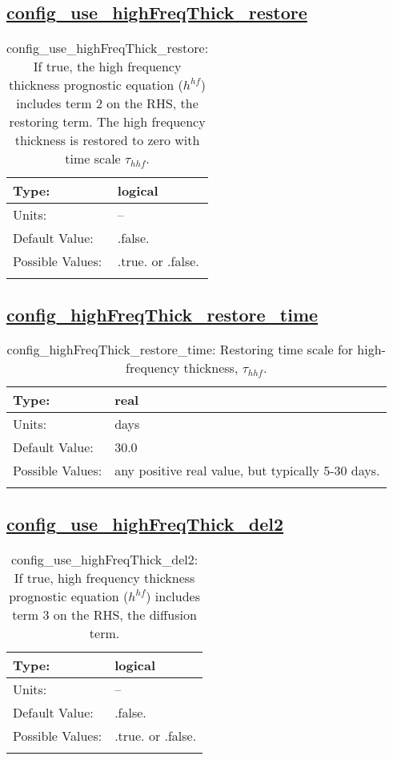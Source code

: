 \subsection[config\_use\_highFreqThick\_restore]{\hyperref[sec:nm_tab_ALE_frequency_filtered_thickness]{config\_use\_highFreqThick\_restore}}
\label{subsec:nm_sec_config_use_highFreqThick_restore}
\begin{center}
\begin{longtable}{| p{2.0in} || p{4.0in} |}
    \hline
    Type: & logical \\
    \hline
    Units: & -- \\
    \hline
    Default Value: & .false. \\
    \hline
    Possible Values: & .true. or .false. \\
    \hline
    \caption{config\_use\_highFreqThick\_restore: If true, the high frequency thickness prognostic equation ($h^{hf}$) includes term 2 on the RHS, the restoring term.  The high frequency thickness is restored to zero with time scale $\tau_{hhf}$.}
\end{longtable}
\end{center}
\subsection[config\_highFreqThick\_restore\_time]{\hyperref[sec:nm_tab_ALE_frequency_filtered_thickness]{config\_highFreqThick\_restore\_time}}
\label{subsec:nm_sec_config_highFreqThick_restore_time}
\begin{center}
\begin{longtable}{| p{2.0in} || p{4.0in} |}
    \hline
    Type: & real \\
    \hline
    Units: & \si{days} \\
    \hline
    Default Value: & 30.0 \\
    \hline
    Possible Values: & any positive real value, but typically 5-30 days. \\
    \hline
    \caption{config\_highFreqThick\_restore\_time: Restoring time scale for high-frequency thickness, $\tau_{hhf}$.}
\end{longtable}
\end{center}
\subsection[config\_use\_highFreqThick\_del2]{\hyperref[sec:nm_tab_ALE_frequency_filtered_thickness]{config\_use\_highFreqThick\_del2}}
\label{subsec:nm_sec_config_use_highFreqThick_del2}
\begin{center}
\begin{longtable}{| p{2.0in} || p{4.0in} |}
    \hline
    Type: & logical \\
    \hline
    Units: & -- \\
    \hline
    Default Value: & .false. \\
    \hline
    Possible Values: & .true. or .false. \\
    \hline
    \caption{config\_use\_highFreqThick\_del2: If true, high frequency thickness prognostic equation ($h^{hf}$) includes term 3 on the RHS, the diffusion term.}
\end{longtable}
\end{center}
